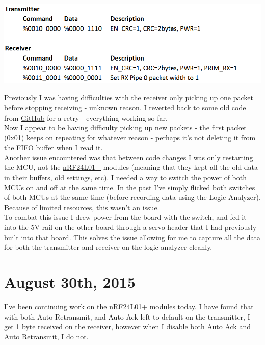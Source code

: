     		\centerline{\includegraphics[width=\linewidth]{images/nRF_Protocol}}
    		\vspace{10pt}
    		
    		Previously I was having difficulties with the receiver only picking up one packet before stopping receiving - unknown reason. I reverted back to some old code from \hyperref[Git]{GitHub} for a retry - everything working so far.\\
    		
    		Now I appear to be having difficulty picking up new packets - the first packet (0x01) keeps on repeating for whatever reason - perhaps it's not deleting it from the FIFO buffer when I read it.\\
    		
    		Another issue encountered was that between code changes I was only restarting the MCU, not the \hyperref[sec:nRF24L01+]{nRF24L01+} modules (meaning that they kept all the old data in their buffers, old settings, etc). I needed a way to switch the power of both MCUs on and off at the same time. In the past I've simply flicked both switches of both MCUs at the same time (before recording data using the Logic Analyzer). Because of limited resources, this wasn't an issue.\\
    		
    		To combat this issue I drew power from the board with the switch, and fed it into the 5V rail on the other board through a servo header that I had previously built into that board. This solves the issue allowing for me to capture all the data for both the transmitter and receiver on the logic analyzer cleanly.\\
    		
    	\section{August 30th, 2015}
    		I've been continuing work on the \hyperref[sec:nRF24L01+]{nRF24L01+} modules today. I have found that with both Auto Retransmit, and Auto Ack left to default on the transmitter, I get 1 byte received on the receiver, however when I disable both Auto Ack and Auto Retransmit, I do not.\\
    		

